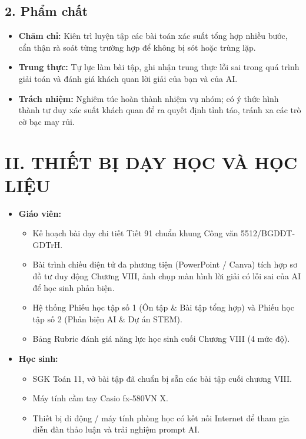 \documentclass[12pt, a4paper]{article}
\begin{document}
\subsection*{2. Phẩm chất}

\begin{itemize}[leftmargin=1.2cm]
    \item \textbf{Chăm chỉ:} Kiên trì luyện tập các bài toán xác suất tổng hợp nhiều bước, cẩn thận rà soát từng trường hợp để không bị sót hoặc trùng lặp.
    \item \textbf{Trung thực:} Tự lực làm bài tập, ghi nhận trung thực lỗi sai trong quá trình giải toán và đánh giá khách quan lời giải của bạn và của AI.
    \item \textbf{Trách nhiệm:} Nghiêm túc hoàn thành nhiệm vụ nhóm; có ý thức hình thành tư duy xác suất khách quan để ra quyết định tỉnh táo, tránh xa các trò cờ bạc may rủi.
\end{itemize}

\section*{II. THIẾT BỊ DẠY HỌC VÀ HỌC LIỆU}

\begin{itemize}[leftmargin=1.2cm]
    \item \textbf{Giáo viên:}
    \begin{itemize}[leftmargin=0.6cm]
        \item Kế hoạch bài dạy chi tiết Tiết 91 chuẩn khung Công văn 5512/BGDĐT-GDTrH.
        \item Bài trình chiếu điện tử đa phương tiện (PowerPoint / Canva) tích hợp sơ đồ tư duy động Chương VIII, ảnh chụp màn hình lời giải có lỗi sai của AI để học sinh phản biện.
        \item Hệ thống Phiếu học tập số 1 (Ôn tập \& Bài tập tổng hợp) và Phiếu học tập số 2 (Phản biện AI \& Dự án STEM).
        \item Bảng Rubric đánh giá năng lực học sinh cuối Chương VIII (4 mức độ).
    \end{itemize}
    \item \textbf{Học sinh:}
    \begin{itemize}[leftmargin=0.6cm]
        \item SGK Toán 11, vở bài tập đã chuẩn bị sẵn các bài tập cuối chương VIII.
        \item Máy tính cầm tay Casio fx-580VN X.
        \item Thiết bị di động / máy tính phòng học có kết nối Internet để tham gia diễn đàn thảo luận và trải nghiệm prompt AI.
    \end{itemize}
\end{itemize}
\end{document}

